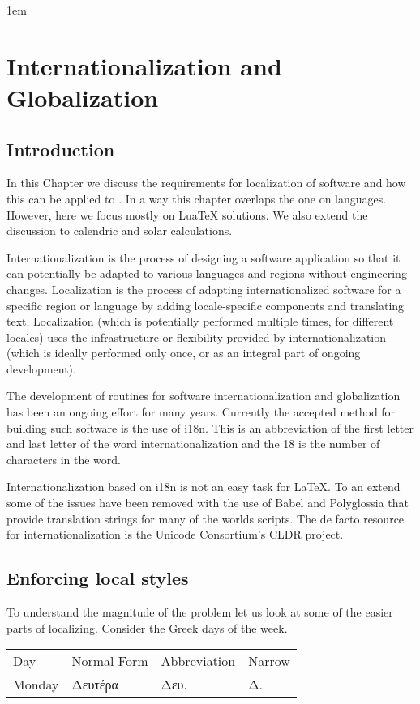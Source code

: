 \parindent1em


\chapter{Internationalization and Globalization}


\section{Introduction}

In this Chapter we discuss the requirements for localization of software and how this can be applied to \latex. In a way this chapter overlaps the one on languages. However, here we focus mostly on LuaTeX solutions. We also extend the discussion to calendric and solar calculations.

Internationalization is the process of designing a software application so that it can potentially be adapted to various languages and regions without engineering changes. Localization is the process of adapting internationalized software for a specific region or language by adding locale-specific components and translating text. Localization (which is potentially performed multiple times, for different locales) uses the infrastructure or flexibility provided by internationalization (which is ideally performed only once, or as an integral part of ongoing development).

The development of routines for software internationalization and globalization has been an ongoing effort for many years. Currently the accepted method for building such software is the use of i18n. This is an abbreviation of the first letter and last letter of the word internationalization and the 18 is the number of characters in the word.

Internationalization based on i18n is not an easy task for \LaTeX. To an extend some of the issues have been removed with the use of Babel and Polyglossia that provide translation strings for many of the worlds scripts. The de facto resource for internationalization is the Unicode Consortium’s \href{http://cldr.unicode.org/}{CLDR} project.

\section{Enforcing local styles}

To understand the magnitude of the problem let us look at some of the easier parts of localizing. Consider the Greek days of the week.
\medskip
\begin{trivlist}\item[]\panunicode
\begin{tabular}{llll}
\toprule
Day &Normal Form &Abbreviation &Narrow\\
Monday &Δευτέρα &Δευ. &Δ. \\
\midrule
\end{tabular}
\end{trivlist}

